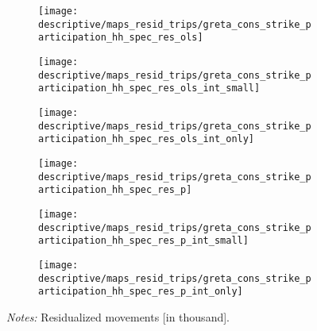 \vspace*{\fill}\clearpage
\begin{landscape}
	\vspace*{\fill}
	\begin{figure}[H]\centering
		\caption{Strike participation using alternative participation measures}
		\label{fig_greta_cons:strike_participation_hh_different_measure}
		\begin{subfigure}[h]{0.22\linewidth}\centering
			\texttt{[image: descriptive/maps\_resid\_trips/greta\_cons\_strike\_participation\_hh\_spec\_res\_ols]}
		\end{subfigure}
		\begin{subfigure}[h]{0.22\linewidth}\centering
			\texttt{[image: descriptive/maps\_resid\_trips/greta\_cons\_strike\_participation\_hh\_spec\_res\_ols\_int\_small]}
		\end{subfigure}
		\begin{subfigure}[h]{0.22\linewidth}\centering
			\texttt{[image: descriptive/maps\_resid\_trips/greta\_cons\_strike\_participation\_hh\_spec\_res\_ols\_int\_only]}
		\end{subfigure}
		
		\begin{subfigure}[h]{0.22\linewidth}\centering
			\texttt{[image: descriptive/maps\_resid\_trips/greta\_cons\_strike\_participation\_hh\_spec\_res\_p]}
		\end{subfigure}
		\begin{subfigure}[h]{0.22\linewidth}\centering
			\texttt{[image: descriptive/maps\_resid\_trips/greta\_cons\_strike\_participation\_hh\_spec\_res\_p\_int\_small]}
		\end{subfigure}
		\begin{subfigure}[h]{0.22\linewidth}\centering
			\texttt{[image: descriptive/maps\_resid\_trips/greta\_cons\_strike\_participation\_hh\_spec\_res\_p\_int\_only]}
		\end{subfigure}
		
		
		\begin{minipage}{0.9\linewidth}
			\scriptsize{\emph{Notes:} Residualized movements [in thousand].}
		\end{minipage}
	\end{figure}
	\vspace*{\fill}\clearpage
\end{landscape}
\restoregeometry

